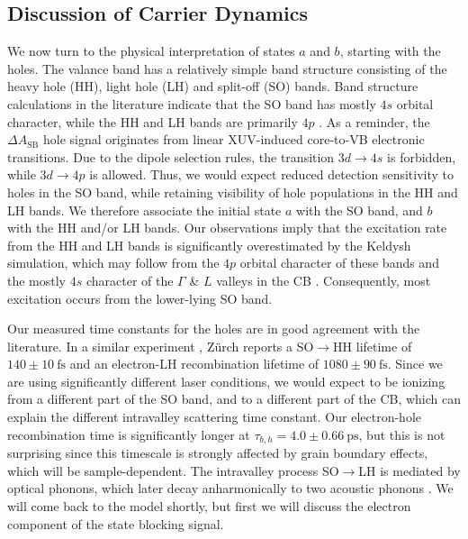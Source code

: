\subsection{Discussion of Carrier Dynamics}
\label{sec:carrier_dyn_discussion}

We now turn to the physical interpretation of states $a$ and $b$, starting with the holes. The valance band has a relatively simple band structure consisting of the heavy hole (HH), light hole (LH) and split-off (SO) bands. Band structure calculations in the literature indicate that the SO band has mostly $4s$ orbital character, while the HH and LH bands are primarily $4p$ \cite{zurchDirectSimultaneousObservation2017}. As a reminder, the $\Delta A_{\textrm{SB}}$ hole signal originates from linear XUV-induced core-to-VB electronic transitions. Due to the dipole selection rules, the transition $3d \rightarrow 4s$ is forbidden, while $3d \rightarrow 4p$ is allowed. Thus, we would expect reduced detection sensitivity to holes in the SO band, while retaining visibility of hole populations in the HH and LH bands. We therefore associate the initial state $a$ with the SO band, and $b$ with the HH and/or LH bands. Our observations imply that the excitation rate from the HH and LH bands is significantly overestimated by the Keldysh simulation, which may follow from the $4p$ orbital character of these bands and the mostly $4s$ character of the $\Gamma$ \& $L$ valleys in the CB \cite{kaplanFemtosecondTrackingCarrier2018}. Consequently, most excitation occurs from the lower-lying SO band.

Our measured time constants for the holes are in good agreement with the literature. In a similar experiment \cite{zurchDirectSimultaneousObservation2017}, Z\"{u}rch reports a SO$\rightarrow$HH lifetime of $140 \pm 10 \ \textrm{fs}$ and an electron-LH recombination lifetime of $1080 \pm 90 \ \textrm{fs}$. Since we are using significantly different laser conditions, we would expect to be ionizing from a different part of the SO band, and to a different part of the CB, which can explain the different intravalley scattering time constant. Our electron-hole recombination time is significantly longer at $\tau_{b,h} = 4.0 \pm 0.66 \ \textrm{ps}$, but this is not surprising since this timescale is strongly affected by grain boundary effects, which will be sample-dependent. The intravalley process SO$\rightarrow$LH is mediated by optical phonons, which later decay anharmonically to two acoustic phonons \cite{kaplanFemtosecondTrackingCarrier2018}. We will come back to the model shortly, but first we will discuss the electron component of the state blocking signal.

